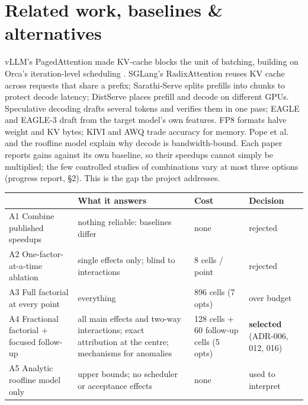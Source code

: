 \documentclass[10pt,a4paper]{article}
\newcommand{\hc}[1]{{\leavevmode\bfseries\color{ink}#1}}   %
\begin{document}
\section{Related work, baselines \& alternatives}
vLLM's PagedAttention \cite{vllm} made KV-cache blocks the unit of batching, building on Orca's iteration-level
scheduling \cite{orca}. SGLang's RadixAttention \cite{sglang} reuses KV cache across requests that share a prefix;
Sarathi-Serve \cite{sarathi} splits prefills into chunks to protect decode latency; DistServe \cite{distserve}
places prefill and decode on different GPUs. Speculative decoding \cite{leviathan,chen} drafts several tokens and
verifies them in one pass; EAGLE \cite{eagle} and EAGLE-3 \cite{eagle3} draft from the target model's own features.
FP8 formats \cite{fp8} halve weight and KV bytes; KIVI \cite{kivi} and AWQ \cite{awq} trade accuracy for memory.
Pope et al.\ \cite{pope} and the roofline model \cite{roofline} explain why decode is bandwidth-bound. Each paper
reports gains against its own baseline, so their speedups cannot simply be multiplied; the few controlled studies of
combinations vary at most three options (progress report, \S2). This is the gap the project addresses.

\begin{table}[H]
\small
{
\begin{tabularx}{\linewidth}{@{}P{4.1cm}LP{2.6cm}P{2.5cm}@{}}
\toprule
\rowcolor{tblhead}\hc{Approach} & \hc{What it answers} & \hc{Cost} & \hc{Decision} \\
\midrule
A1 Combine published speedups & nothing reliable: baselines differ & none & rejected \\
A2 One-factor-at-a-time ablation & single effects only; blind to interactions & 8 cells / point & rejected \\
A3 Full factorial at every point & everything & 896 cells (7 opts) & over budget \\
A4 Fractional factorial + focused follow-up & all main effects and two-way interactions; exact attribution at the
centre; mechanisms for anomalies & 128 cells + 60 follow-up cells (5 opts) & \textbf{selected} (ADR-006, 012, 016) \\
A5 Analytic roofline model only & upper bounds; no scheduler or acceptance effects & none & used to interpret \\
\bottomrule
\end{tabularx}}
\end{table}
\end{document}
